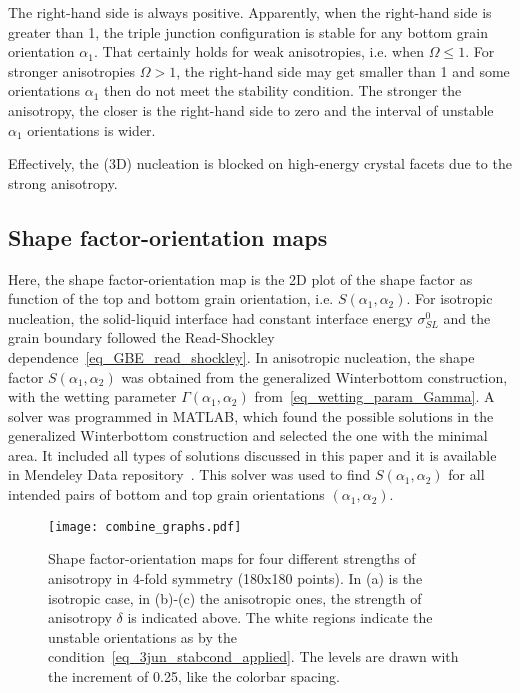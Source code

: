 The right-hand side is always positive. Apparently, when the right-hand side is greater than 1, the triple junction configuration is stable for any bottom grain orientation $\alpha_1$. That certainly holds for weak anisotropies, i.e. when $\Omega\leq 1$. For stronger anisotropies $\Omega>1$, the right-hand side may get smaller than 1 and some orientations $\alpha_1$ then do not meet the stability condition. The stronger the anisotropy, the closer is the right-hand side to zero and the interval of unstable $\alpha_1$ orientations is wider.  

Effectively, the (3D) nucleation is blocked on high-energy crystal facets due to the strong anisotropy. 

\subsection{Shape factor-orientation maps}
Here, the shape factor-orientation map is the 2D plot of the shape factor as function of the top and bottom grain orientation, i.e. $S(\alpha_1,\alpha_2)$. For isotropic nucleation, the solid-liquid interface had constant interface energy $\sigma_{SL}^0$ and the grain boundary followed the Read-Shockley dependence~\eqref{eq_GBE_read_shockley}. In anisotropic nucleation, the shape factor $S(\alpha_1,\alpha_2)$ was obtained from the generalized Winterbottom construction, with the wetting parameter $\Gamma(\alpha_1,\alpha_2)$ from~\eqref{eq_wetting_param_Gamma}. A solver was programmed in MATLAB, which found the possible solutions in the generalized Winterbottom construction and selected the one with the minimal area. It included all types of solutions discussed in this paper and it is available in Mendeley Data repository~\cite{Minar2023dataset}. This solver was used to find $S(\alpha_1,\alpha_2)$ for all intended pairs of bottom and top grain orientations $(\alpha_1,\alpha_2)$.

\begin{figure*}
	\centering        
	\texttt{[image: combine\_graphs.pdf]}
	\caption{Shape factor-orientation maps for four different strengths of anisotropy in 4-fold symmetry (180x180 points). In (a) is the isotropic case, in (b)-(c) the anisotropic ones, the strength of anisotropy $\delta$ is indicated above. The white regions indicate the unstable orientations as by the condition~\eqref{eq_3jun_stabcond_applied}. The levels are drawn with the increment of 0.25, like the colorbar spacing.}
	\label{fig_SFori_maps}
\end{figure*}

